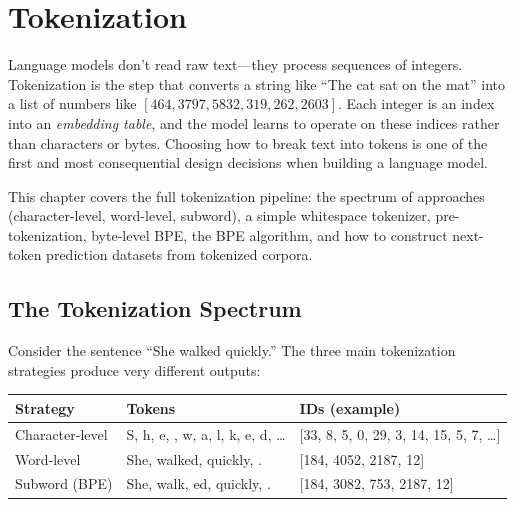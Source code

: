 \chapter{Tokenization}

Language models don't read raw text---they process sequences of integers.
Tokenization is the step that converts a string like ``The cat sat on the
mat'' into a list of numbers like $[464, 3797, 5832, 319, 262, 2603]$.
Each integer is an index into an \emph{embedding table}, and the model
learns to operate on these indices rather than characters or bytes.
Choosing how to break text into tokens is one of the first and most
consequential design decisions when building a language model.

This chapter covers the full tokenization pipeline: the spectrum of
approaches (character-level, word-level, subword), a simple
whitespace tokenizer, pre-tokenization, byte-level BPE, the BPE algorithm,
and how to construct next-token prediction datasets from tokenized
corpora.

\section{The Tokenization Spectrum}

Consider the sentence ``She walked quickly.'' The three main
tokenization strategies produce very different outputs:

\begin{center}
\begin{tabular}{lll}
\toprule
\textbf{Strategy} & \textbf{Tokens} & \textbf{IDs (example)} \\
\midrule
Character-level & S, h, e, \textvisiblespace, w, a, l, k, e, d, \ldots & [33, 8, 5, 0, 29, 3, 14, 15, 5, 7, \ldots] \\
Word-level & She, walked, quickly, . & [184, 4052, 2187, 12] \\
Subword (BPE) & She, walk, ed, quickly, . & [184, 3082, 753, 2187, 12] \\
\bottomrule
\end{tabular}
\end{center}

